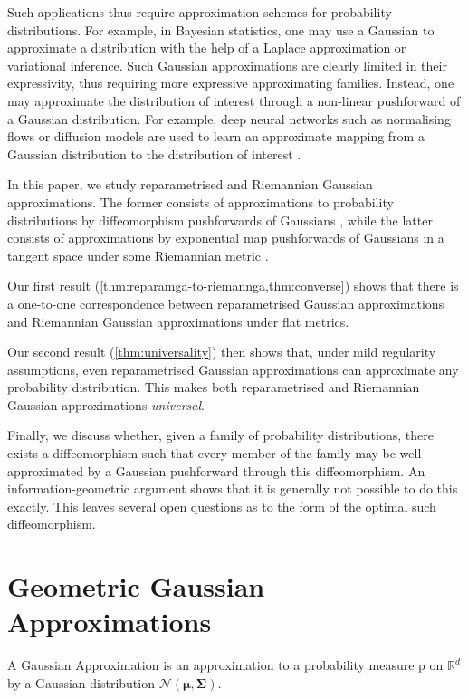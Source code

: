 \documentclass[runningheads,orivec]{llncs}
\newcommand{\R}{\mathbb R}
\begin{document}
Such applications thus require approximation schemes for probability distributions. For example, in Bayesian statistics, one may use a Gaussian to approximate a distribution with the help of a Laplace approximation or variational inference. Such Gaussian approximations are clearly limited in their expressivity, thus requiring more expressive approximating families. Instead, one may approximate the distribution of interest through a non-linear pushforward of a Gaussian distribution. For example, deep neural networks such as normalising flows or diffusion models are used to learn an approximate mapping from a Gaussian distribution to the distribution of interest \cite{kobyzev_normalizing_2021,yang_diffusion_2023}.

In this paper, we study reparametrised and Riemannian Gaussian approximations. The former consists of approximations to probability distributions by diffeomorphism pushforwards of Gaussians \cite{mackay_choice_1998,hobbhahn_laplace_2022,bui_likelihood_2024}, while the latter consists of approximations by exponential map pushforwards of Gaussians in a tangent space under some Riemannian metric \cite{bergamin_riemannian_nodate,yu_riemannian_2024}.

Our first result (\cref{thm:reparamga-to-riemannga,thm:converse}) shows that there is a one-to-one correspondence between reparametrised Gaussian approximations and Riemannian Gaussian approximations under flat metrics.

Our second result (\cref{thm:universality}) then shows that, under mild regularity assumptions, even reparametrised Gaussian approximations can approximate any probability distribution. This makes both reparametrised and Riemannian Gaussian approximations \textit{universal}.

Finally, we discuss whether, given a family of probability distributions, there exists a diffeomorphism such that every member of the family may be well approximated by a Gaussian pushforward through this diffeomorphism. An in\-for\-mation-geometric argument shows that it is generally not possible to do this exactly. This leaves several open questions as to the form of the optimal such diffeomorphism.

\section{Geometric Gaussian Approximations}
\begin{definition}\label{def:ga}
    A \textnormal{Gaussian Approximation} is an approximation to a probability measure $\mathrm p$ on $\R^d$ by a Gaussian distribution $\mathcal N(\bm\mu,\bm\Sigma)$.
\end{definition}
\end{document}
